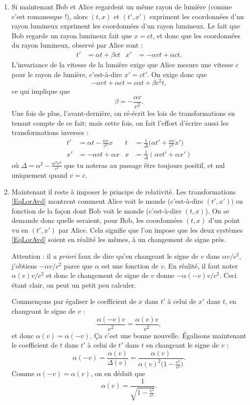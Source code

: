 \begin{enumerate}
\item Si maintenant Bob et Alice regardent un même rayon de lumière (comme c'est romanesque !), alors $(t,x)$ et $(t',x')$ expriment les coordonnées d'un rayon lumineux expriment les coordonnées d'un rayon lumineux. Le fait que Bob regarde un rayon lumineux fait que $x=ct$, et donc que les coordonnées du rayon lumineux, observé par Alice sont :
\begin{align}
   t'&=\alpha t+\beta ct	&x'&=-\alpha v t+\alpha c t.
\end{align}
L'invariance de la vitesse de la lumière exige que Alice mesure une vitesse $c$ pour le rayon de lumière, c'est-à-dire $x'=ct'$. On exige donc que
\[
  -\alpha v t+\alpha ct=c\alpha t+\beta c^2t,
\]
ce qui implique que
\[
  \beta=-\frac{ \alpha v }{ c^2 }.
\]
Une fois de plus, l'avant-dernière,  on ré-écrit les lois de transformations en tenant compte de ce fait; mais cette fois, on fait l'effort d'écrire aussi les transformations inverses :
\begin{align}	\label{EqLorAvd}
t'&=\alpha t-\frac{ \alpha v }{ c^2 }x		& t&=\frac{1}{ \Delta }\big( \alpha t'+\frac{ \alpha v }{ c^2 }x' \big)\\
x'&=-\alpha vt+\alpha x				& x&=\frac{1}{ \Delta }(\alpha v t'+\alpha x')
\end{align}
où $\Delta=\alpha^2-\frac{ \alpha^2 v^2 }{ c^2 }$ que tu noteras au passage être toujours positif, et nul uniquement quand $v=c$.

\item Maintenant il reste à imposer le principe de relativité. Les transformations \eqref{EqLorAvd} montrent comment Alice voit le monde (c'est-à-dire $(t',x'))$ en fonction de la façon dont Bob voit le monde (c'est-à-dire $(t,x)$). On se demande donc quelle seraient, pour Bob, les coordonnées $(t,x)$ d'un point vu en $(t',x')$ par Alice. Cela signifie que l'on impose que les deux systèmes \eqref{EqLorAvd} soient en réalité les mêmes, à un changement de signe près.

Attention : il \emph{a priori} faux de dire qu'en changeant le signe de $v$ dans $\alpha v/c^2$, j'obtiens $-\alpha v/c^2$ parce que $\alpha$ est une fonction de $v$. En réalité, il faut noter $\alpha(v)v/c^2$ et donc le changement de signe de $v$ donne $-\alpha(-v)v/c^2$. Ceci étant clair, on peut un petit peu calculer.

Commençons par égaliser le coefficient de $x$ dans $t'$ à celui de $x'$ dans $t$, en changeant le signe de $v$ :
\[
  \frac{ \alpha(-v)v }{ c^2 }=\frac{ \alpha(v)v }{ c^2 },
\]
 et donc $\alpha(v)=\alpha(-v)$. Ça c'est une bonne nouvelle. Égalisons maintenant le coefficient de $t$ dans $t'$ à celui de $t'$ dans $t$ en changeant le signe de $v$ :
\[
  \alpha(-v)=\frac{ \alpha(v) }{ \Delta(v) }=\frac{ \alpha(v) }{ \alpha(v)^2\big( 1-\frac{ v^2 }{ c^2 } \big) }.
\]
Comme $\alpha(-v)=\alpha(v)$, on en déduit que
\begin{equation}		\label{EqalphaLo}
\alpha(v)=\frac{1}{ \sqrt{1-\frac{ v^2 }{ c^2 }} }.
\end{equation}
\end{enumerate}

